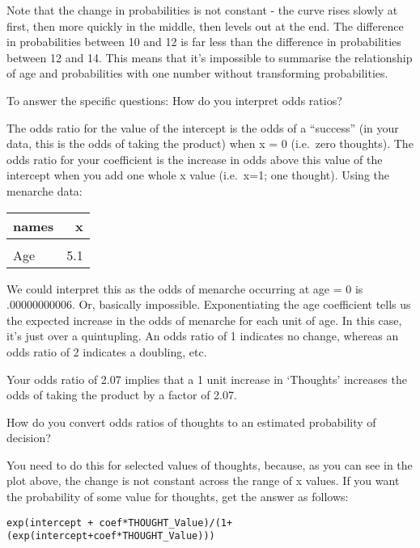 \documentclass[11pt,dvipsnames,ignorenonframetext,aspectratio=169]{beamer}
\begin{document}
\begin{frame}{}
\protect\hypertarget{section-13}{}
Note that the change in probabilities is not constant - the curve rises
slowly at first, then more quickly in the middle, then levels out at the
end. The difference in probabilities between 10 and 12 is far less than
the difference in probabilities between 12 and 14. This means that it's
impossible to summarise the relationship of age and probabilities with
one number without transforming probabilities.

To answer the specific questions: How do you interpret odds ratios?

The odds ratio for the value of the intercept is the odds of a
``success'' (in your data, this is the odds of taking the product) when
x = 0 (i.e.~zero thoughts). The odds ratio for your coefficient is the
increase in odds above this value of the intercept when you add one
whole x value (i.e.~x=1; one thought). Using the menarche data:

\begin{table}
\centering\begingroup\fontsize{6}{8}\selectfont

\begin{tabular}{lr}
\toprule
names & x\\
\midrule
\cellcolor{gray!6}{(Intercept)} & \cellcolor{gray!6}{0.0}\\
Age & 5.1\\
\bottomrule
\end{tabular}
\endgroup{}
\end{table}
\end{frame}

\begin{frame}[fragile]{}
\protect\hypertarget{section-14}{}
We could interpret this as the odds of menarche occurring at age = 0 is
.00000000006. Or, basically impossible. Exponentiating the age
coefficient tells us the expected increase in the odds of menarche for
each unit of age. In this case, it's just over a quintupling. An odds
ratio of 1 indicates no change, whereas an odds ratio of 2 indicates a
doubling, etc.

Your odds ratio of 2.07 implies that a 1 unit increase in `Thoughts'
increases the odds of taking the product by a factor of 2.07.

How do you convert odds ratios of thoughts to an estimated probability
of decision?

You need to do this for selected values of thoughts, because, as you can
see in the plot above, the change is not constant across the range of x
values. If you want the probability of some value for thoughts, get the
answer as follows:

\texttt{exp(intercept\ +\ coef*THOUGHT\_Value)/(1+(exp(intercept+coef*THOUGHT\_Value)))}
\end{frame}
\end{document}

